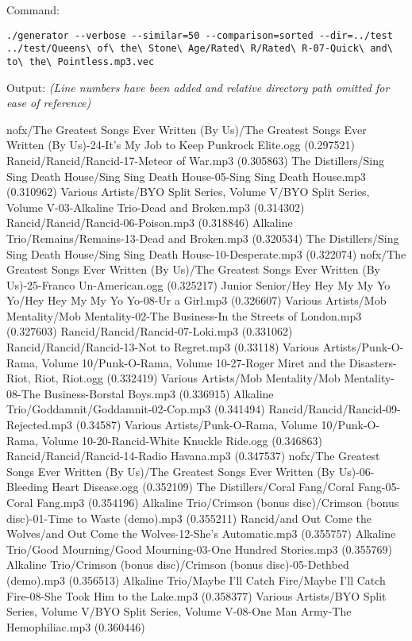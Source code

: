 Command:
\begin{verbatim}
./generator --verbose --similar=50 --comparison=sorted --dir=../test
../test/Queens\ of\ the\ Stone\ Age/Rated\ R/Rated\ R-07-Quick\ and\ to\ the\ Pointless.mp3.vec
\end{verbatim}
Output: \small \emph{(Line numbers have been added and relative directory path omitted for ease of reference)}
\begin{listing}{1}
nofx/The Greatest Songs Ever Written (By Us)/The Greatest Songs Ever Written (By Us)-24-It's My Job to Keep Punkrock Elite.ogg (0.297521)
Rancid/Rancid/Rancid-17-Meteor of War.mp3 (0.305863)
The Distillers/Sing Sing Death House/Sing Sing Death House-05-Sing Sing Death House.mp3 (0.310962)
Various Artists/BYO Split Series, Volume V/BYO Split Series, Volume V-03-Alkaline Trio-Dead and Broken.mp3 (0.314302)
Rancid/Rancid/Rancid-06-Poison.mp3 (0.318846)
Alkaline Trio/Remains/Remains-13-Dead and Broken.mp3 (0.320534)
The Distillers/Sing Sing Death House/Sing Sing Death House-10-Desperate.mp3 (0.322074)
nofx/The Greatest Songs Ever Written (By Us)/The Greatest Songs Ever Written (By Us)-25-Franco Un-American.ogg (0.325217)
Junior Senior/Hey Hey My My Yo Yo/Hey Hey My My Yo Yo-08-Ur a Girl.mp3 (0.326607)
Various Artists/Mob Mentality/Mob Mentality-02-The Business-In the Streets of London.mp3 (0.327603)
Rancid/Rancid/Rancid-07-Loki.mp3 (0.331062)
Rancid/Rancid/Rancid-13-Not to Regret.mp3 (0.33118)
Various Artists/Punk-O-Rama, Volume 10/Punk-O-Rama, Volume 10-27-Roger Miret and the Disasters-Riot, Riot, Riot.ogg (0.332419)
Various Artists/Mob Mentality/Mob Mentality-08-The Business-Borstal Boys.mp3 (0.336915)
Alkaline Trio/Goddamnit/Goddamnit-02-Cop.mp3 (0.341494)
Rancid/Rancid/Rancid-09-Rejected.mp3 (0.34587)
Various Artists/Punk-O-Rama, Volume 10/Punk-O-Rama, Volume 10-20-Rancid-White Knuckle Ride.ogg (0.346863)
Rancid/Rancid/Rancid-14-Radio Havana.mp3 (0.347537)
nofx/The Greatest Songs Ever Written (By Us)/The Greatest Songs Ever Written (By Us)-06-Bleeding Heart Disease.ogg (0.352109)
The Distillers/Coral Fang/Coral Fang-05-Coral Fang.mp3 (0.354196)
Alkaline Trio/Crimson (bonus disc)/Crimson (bonus disc)-01-Time to Waste (demo).mp3 (0.355211)
Rancid/and Out Come the Wolves/and Out Come the Wolves-12-She's Automatic.mp3 (0.355757)
Alkaline Trio/Good Mourning/Good Mourning-03-One Hundred Stories.mp3 (0.355769)
Alkaline Trio/Crimson (bonus disc)/Crimson (bonus disc)-05-Dethbed (demo).mp3 (0.356513)
Alkaline Trio/Maybe I'll Catch Fire/Maybe I'll Catch Fire-08-She Took Him to the Lake.mp3 (0.358377)
Various Artists/BYO Split Series, Volume V/BYO Split Series, Volume V-08-One Man Army-The Hemophiliac.mp3 (0.360446)

\end{listing}
